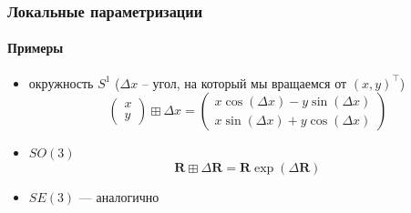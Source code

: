 \documentclass[notheorems,aspectratio=169]{beamer}
\begin{document}
\begin{frame}
  \frametitle{Локальные параметризации}
  \framesubtitle{Примеры}
  \begin{itemize}
    \item окружность $S^1$ ($\Delta x$ -- угол, на который мы вращаемся от $\left(x, y\right)^\intercal$)
      $$
      \begin{pmatrix}
        x \\
        y
      \end{pmatrix}
        \boxplus\Delta x=
      \begin{pmatrix}
        x\cos\left(\Delta x\right)-y\sin\left(\Delta x\right) \\
        x\sin\left(\Delta x\right)+y\cos\left(\Delta x\right)
      \end{pmatrix}
      $$
    \item $SO(3)$
      $$\mathbf{\mathbf{R}}\boxplus\Delta\mathbf{R}=\mathbf{R}\exp\left(\Delta\mathbf{R}\right)$$
    \item $SE(3)$ --- аналогично
  \end{itemize}
\end{frame}
\end{document}
